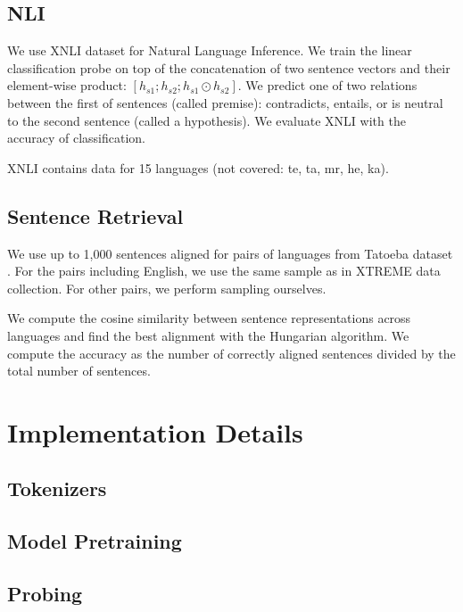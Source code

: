\subsection{NLI}

We use XNLI dataset \cite{conneau_xnli_2018} for Natural Language Inference. We train the linear classification probe on top of the concatenation of two sentence vectors and their element-wise product: $[h_{s1}; h_{s2}; h_{s1} \odot h_{s2}]$. We predict one of two relations between the first of sentences (called premise): contradicts, entails, or is neutral to the second sentence (called a hypothesis). We evaluate XNLI with the accuracy of classification.

XNLI contains data for 15 languages (not covered: te, ta, mr, he, ka).

\subsection{Sentence Retrieval}
We use up to 1,000 sentences aligned for pairs of languages from Tatoeba dataset \cite{artetxe_massively_2019}. For the pairs including English, we use the same sample as in XTREME data collection. For other pairs, we perform sampling ourselves. 

We compute the cosine similarity between sentence representations across languages and find the best alignment with the Hungarian algorithm\cite{kuhn_hungarian_1955}. We compute the accuracy as the number of correctly aligned sentences divided by the total number of sentences.


\section{Implementation Details}

\subsection{Tokenizers}
\subsection{Model Pretraining}
\subsection{Probing}


